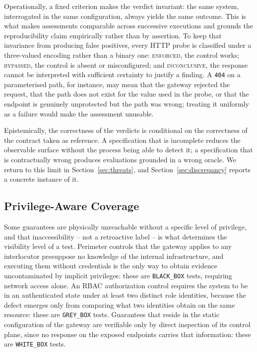\documentclass[
]{ceurart}
\begin{document}
Operationally, a fixed criterion makes the verdict invariant: the same system, interrogated in the same configuration, always yields the same outcome.
This is what makes assessments comparable across successive executions and grounds the reproducibility claim empirically rather than by assertion.
To keep that invariance from producing false positives, every HTTP probe is classified under a three-valued encoding rather than a binary one: \textsc{enforced}, the control works; \textsc{bypassed}, the control is absent or misconfigured; and \textsc{inconclusive}, the response cannot be interpreted with sufficient certainty to justify a finding.
A \texttt{404} on a parameterised path, for instance, may mean that the gateway rejected the request, that the path does not exist for the value used in the probe, or that the endpoint is genuinely unprotected but the path was wrong; treating it uniformly as a failure would make the assessment unusable.

Epistemically, the correctness of the verdicts is conditional on the correctness of the contract taken as reference.
A specification that is incomplete reduces the observable surface without the process being able to detect it; a specification that is contractually wrong produces evaluations grounded in a wrong oracle.
We return to this limit in Section~\ref{sec:threats}, and Section~\ref{sec:discrepancy} reports a concrete instance of it.

\subsection{Privilege-Aware Coverage}

Some guarantees are physically unreachable without a specific level of privilege, and that inaccessibility -- not a retroactive label -- is what determines the visibility level of a test.
Perimeter controls that the gateway applies to any interlocutor presuppose no knowledge of the internal infrastructure, and executing them without credentials is the only way to obtain evidence uncontaminated by implicit privileges: these are \texttt{BLACK\_BOX} tests, requiring network access alone.
An RBAC authorization control requires the system to be in an authenticated state under at least two distinct role identities, because the defect emerges only from comparing what two identities obtain on the same resource: these are \texttt{GREY\_BOX} tests.
Guarantees that reside in the static configuration of the gateway are verifiable only by direct inspection of its control plane, since no response on the exposed endpoints carries that information: these are \texttt{WHITE\_BOX} tests.
\end{document}

